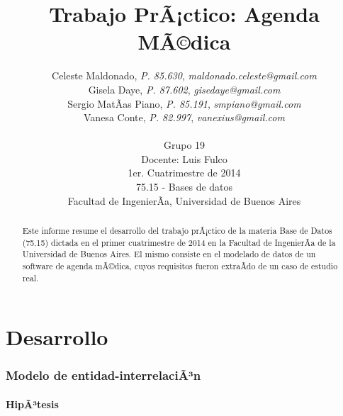 \documentclass[a4paper,11pt]{article}
\title{\textbf{Trabajo PrÃ¡ctico: Agenda MÃ©dica}}
\author{
  Celeste Maldonado,	\textit{P. 85.630},	\textit{maldonado.celeste@gmail.com}	\\
  Gisela Daye,		\textit{P. 87.602},	\textit{gisedaye@gmail.com}		\\
  Sergio MatÃ­as Piano,	\textit{P. 85.191},	\textit{smpiano@gmail.com}		\\
  Vanesa Conte,		\textit{P. 82.997},	\textit{vanexius@gmail.com}		\\
  \\
  \normalsize{Grupo 19}							\\
  \normalsize{Docente: Luis Fulco}					\\
  \normalsize{1er. Cuatrimestre de 2014}                           	\\
  \normalsize{75.15 - Bases de datos}                              	\\
  \normalsize{Facultad de IngenierÃ­a, Universidad de Buenos Aires}
}
\date{}
\begin{document}
\thispagestyle{empty}

\null  %
\nointerlineskip  %
\vfill
\let\snewpage \newpage
\let\newpage \relax

\maketitle

\begin{abstract}

  Este informe resume el desarrollo del trabajo prÃ¡ctico de la materia Base
  de Datos (75.15) dictada en el primer cuatrimestre de 2014 en la Facultad de
  IngenierÃ­a de la Universidad de Buenos Aires. El mismo consiste en el
  modelado de datos de un software de agenda mÃ©dica,
  cuyos requisitos fueron extraÃ­do de un caso de estudio real.

\end{abstract}

\let \newpage \snewpage
\vfill 
\break %
\clearpage

\tableofcontents
\clearpage


\part{Desarrollo}


\section{Modelo de entidad-interrelaciÃ³n} \label{sec:der}

\subsection{HipÃ³tesis}
\end{document}
